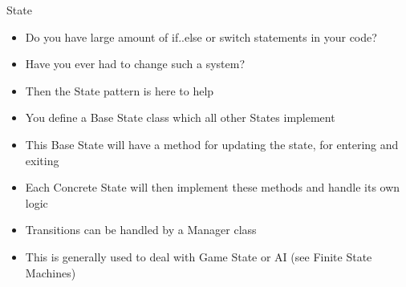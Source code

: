 \begin{frame}{State}
	\begin{itemize}
		\item Do you have large amount of if..else or switch statements in your code?
		\item Have you ever had to change such a system?
		\item Then the State pattern is here to help
		\item You define a Base State class which all other States implement
		\item This Base State will have a method for updating the state, for entering and exiting
		\item Each Concrete State will then implement these methods and handle its own logic 
		\item Transitions can be handled by a Manager class
		\item This is generally used to deal with Game State or AI (see Finite State Machines)
	\end{itemize}
\end{frame}